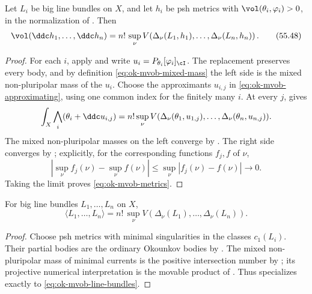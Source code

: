 \begin{theorem}\label{thm:ok-mvob-metrics}
Let \(L_i\) be big line bundles on \(X\), and let \(h_i\) be psh metrics
with \(\vol(\theta_i,\varphi_i)>0\), in the normalization of
.  Then
\[
 \vol(\ddc h_1,\dots,\ddc h_n)
 =n!\,\sup_\nu V\!\left(
    \Delta_\nu(L_1,h_1),\dots,\Delta_\nu(L_n,h_n)\right).
\tag{55.48}\label{eq:ok-mvob-metrics}
\]
\end{theorem}

\begin{proof}
For each \(i\), apply  and write
\(u_i=P_{\theta_i}[\varphi_i]_{\cI}\).  The replacement preserves every
body, and by definition \eqref{eq:ok-mvob-mixed-mass} the left side is the
mixed non-pluripolar mass of the \(u_i\).  Choose the approximants
\(u_{i,j}\) in \eqref{eq:ok-mvob-approximating}, using one common index for
the finitely many \(i\).  At every \(j\),
 gives
\[
 \int_X\bigwedge_i(\theta_i+\ddc u_{i,j})
 =n!\sup_\nu V(\Delta_\nu(\theta_1,u_{1,j}),\ldots,
                    \Delta_\nu(\theta_n,u_{n,j})).
\]
The mixed non-pluripolar masses on the left converge by
\cite[Theorem~6.2.1]{XiaBook}.  The right side converges by
; explicitly, for the corresponding functions
\(f_j,f\) of \(\nu\),
\[
 \left|\sup_\nu f_j(\nu)-\sup_\nu f(\nu)\right|
 \leq\sup_\nu|f_j(\nu)-f(\nu)|\longrightarrow0.
\]
Taking the limit proves \eqref{eq:ok-mvob-metrics}.
\end{proof}

\begin{theorem}\label{thm:ok-mvob-line-bundles}
For big line bundles \(L_1,\ldots,L_n\) on \(X\),
\[
 \langle L_1,\dots,L_n\rangle
 =n!\,\sup_\nu V\!\left(
     \Delta_\nu(L_1),\dots,\Delta_\nu(L_n)\right).
\tag{55.49}\label{eq:ok-mvob-line-bundles}
\]
\end{theorem}

\begin{proof}
Choose psh metrics with minimal singularities in the classes \(c_1(L_i)\).
Their partial bodies are the ordinary Okounkov bodies by
.  The mixed non-pluripolar mass of
minimal currents is the positive intersection number by
\cite[Definition~1.17]{BEGZ10}; its projective numerical interpretation is
the movable product of \cite[Propositions~2.12--2.13]{BFJ09}.
Thus  specializes exactly to
\eqref{eq:ok-mvob-line-bundles}.
\end{proof}

